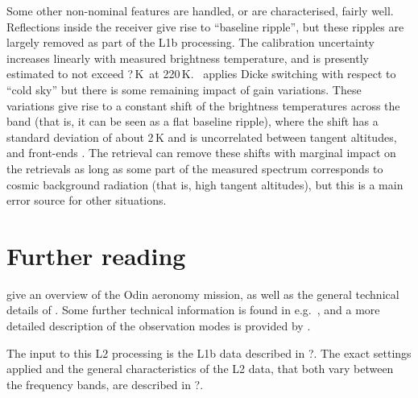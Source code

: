 Some other non-nominal features are handled, or are characterised, fairly
well. Reflections inside the receiver give rise to ``baseline ripple'', but
these ripples are largely removed as part of the L1b processing\addref. The
calibration uncertainty increases linearly with measured brightness
temperature, and is presently estimated to not exceed ?\,K\ at
220\,K. \smr\ applies Dicke switching with respect to ``cold sky'' but there is
some remaining impact of gain variations. These variations give rise to a
constant shift of the brightness temperatures across the band (that is, it can
be seen as a flat baseline ripple), where the shift has a standard deviation of
about 2\,K and is uncorrelated between tangent altitudes, and front-ends . The
retrieval can remove these shifts with marginal impact on the retrievals as
long as some part of the measured spectrum corresponds to cosmic background
radiation (that is, high tangent altitudes), but this is a main error source
for other situations.



\section{Further reading}
\label{sec:reading}
%
\citet{murtagh:anove:02} give an overview of the Odin aeronomy mission, as well
as the general technical details of \smr. Some further technical information
is found in e.g.\ \citet{eriksson:studi:02}, and a more detailed description of
the observation modes is provided by \citet{merino:studi:02}.

The input to this L2 processing is the L1b data described in ?\addref. The
exact settings applied and the general characteristics of the L2 data, that
both vary between the frequency bands, are described in ?\addref.




